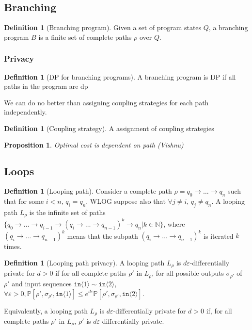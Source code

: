 \documentclass[12pt]{article}
\newcommand{\NN}{\mathbb{N}}
\newcommand{\PP}{\mathbb{P}}
\newcommand{\brangle}[1]{\langle #1 \rangle}
\newtheorem{prop}[thm]{Proposition}
\theoremstyle{definition}
\newtheorem{defn}[thm]{Definition}
\begin{document}
\subsection{Branching}

\begin{defn}[Branching program]
    Given a set of program states $Q$, a branching program $B$ is a finite set of complete paths $\rho$ over $Q$. 
\end{defn}

\subsubsection{Privacy}

\begin{defn}[DP for branching programs]
    A branching program is DP if all paths in the program are dp 
\end{defn}


We can do no better than assigning coupling strategies for each path independently. 
\begin{defn}[Coupling strategy]
    A assignment of coupling strategies 
\end{defn}

\begin{prop}
    Optimal cost is dependent on path (Vishnu)
\end{prop}

\subsection{Loops}

\begin{defn}[Looping path]
    Consider a complete path $\rho = q_0\to\ldots \to q_n$ such that for some $i<n$, $q_i = q_n$. WLOG suppose also that $\forall j\neq i$, $q_j \neq q_n$. A looping path $L_\rho$ is the infinite set of paths $\{q_0\to\ldots\to q_{i-1}\to (q_i\to\ldots\to q_{n-1})^k\to q_n| k\in \NN\}$, where $(q_i\to\ldots\to q_{n-1})^k$ means that the subpath $(q_i\to\ldots\to q_{n-1})^k$ is iterated $k$ times. 
\end{defn}

\begin{defn}[Looping path privacy]
    A looping path $L_\rho$ is $d\varepsilon$-differentially private for $d>0$ if for all complete paths $\rho'$ in $L_\rho$, for all possible outputs $\sigma_{\rho'}$ of $\rho'$ and input sequences $\texttt{in}\brangle{1}\sim \texttt{in}\brangle{2}$, $\forall \varepsilon>0, \PP[\rho', \sigma_{\rho'}, \texttt{in}\brangle{1}]\leq e^{d\varepsilon}\PP[\rho', \sigma_{\rho'}, \texttt{in}\brangle{2}]$.

    Equivalently, a looping path $L_\rho$ is $d\varepsilon$-differentially private for $d>0$ if, for all complete paths $\rho'$ in $L_\rho$, $\rho'$ is $d\varepsilon$-differentially private. 
\end{defn}
\end{document}
